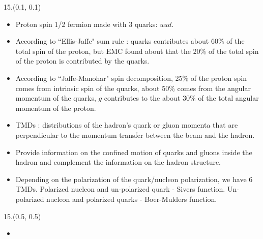 \documentclass[8pt, xcolor={dvipsnames}, sans, mathserif]{beamer}
\newenvironment{List}[2]
{\begin{textblock}{#1}#2
\begin{itemize}}
{\end{itemize}
\end{textblock}}
\begin{document}
\begin{frame}
\begin{List}{15.}{(0.1, 0.1)}

  \item Proton spin 1/2 fermion made with 3 quarks: $uud$.

  \item According to ``Ellis-Jaffe" sum rule : quarks contributes about 60\% of the total spin of the proton, but EMC found about that the 20\% of the total spin of the proton is contributed by the quarks.

  \item According to ``Jaffe-Manohar" spin decomposition, 25\% of the proton spin comes from intrinsic spin of the quarks, about 50\% comes from the angular momentum of the quarks, $g$ contributes to the about 30\% of the total angular momentum of the proton.

  \item  TMDs : distributions of the hadron's quark or gluon momenta that are perpendicular to the momentum transfer between the beam and the hadron.

  \item Provide information on the confined motion of quarks and gluons inside the hadron and complement the information on the hadron structure.

  \item Depending on the polarization of the quark/nucleon polarization, we have 6 TMDs. Polarized nucleon and un-polarized quark - Sivers function. Un-polarized nucleon and polarized quarks - Boer-Mulders function.

\end{List}
\end{frame}

\begin{frame}
\begin{List}{15.}{(0.5, 0.5)}

  \item

\end{List}
\end{frame}
\end{document}
